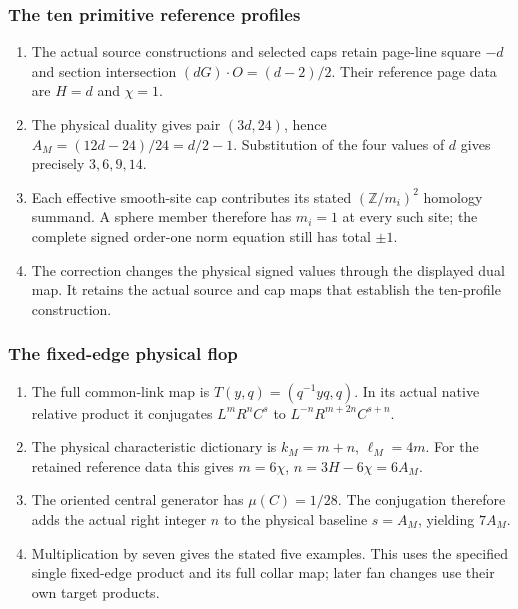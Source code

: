\subsubsection{The ten primitive reference profiles}
\RungOne
\begin{enumerate}[label=\arabic*.]
\item The actual source constructions and selected caps retain
  page-line square $-d$ and section intersection
  $(dG)\cdot O=(d-2)/2$. Their reference page data are
  $H=d$ and $\chi=1$.
\item The physical duality gives pair $(3d,24)$, hence
  $A_M=(12d-24)/24=d/2-1$. Substitution of the four values
  of $d$ gives precisely $3,6,9,14$.
\item Each effective smooth-site cap contributes its stated
  $(\mathbb Z/m_i)^2$ homology summand. A sphere member
  therefore has $m_i=1$ at every such site; the complete
  signed order-one norm equation still has total $\pm1$.
\item The correction changes the physical signed values through
  the displayed dual map. It retains the actual source and cap
  maps that establish the ten-profile construction.
\end{enumerate}

\subsubsection{The fixed-edge physical flop}
\RungOne
\begin{enumerate}[label=\arabic*.]
\item The full common-link map is $T(y,q)=(q^{-1}yq,q)$.
  In its actual native relative product it conjugates
  $L^mR^nC^s$ to $L^{-n}R^{m+2n}C^{s+n}$.
\item The physical characteristic dictionary is
  $k_M=m+n$, $\ell_M=4m$. For the retained reference data
  this gives $m=6\chi$, $n=3H-6\chi=6A_M$.
\item The oriented central generator has $\mu(C)=1/28$.
  The conjugation therefore adds the actual right integer
  $n$ to the physical baseline $s=A_M$, yielding $7A_M$.
\item Multiplication by seven gives the stated five examples.
  This uses the specified single fixed-edge product and
  its full collar map; later fan changes use their own
  target products.
\end{enumerate}

